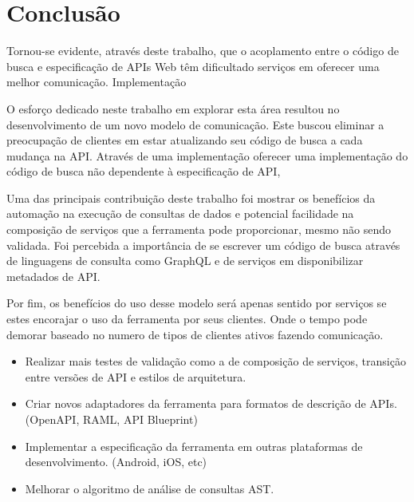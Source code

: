 \chapter{Conclusão}

Tornou-se evidente, através deste trabalho, que o acoplamento entre o código de busca e especificação de APIs Web têm dificultado serviços em oferecer uma melhor comunicação. Implementação %


O esforço dedicado neste trabalho em explorar esta área resultou no desenvolvimento de um novo modelo de comunicação. Este buscou eliminar a preocupação de clientes em estar atualizando seu código de busca a cada mudança na API. Através de uma implementação oferecer uma implementação do código de busca não dependente à especificação de API, 

Uma das principais contribuição deste trabalho foi mostrar os benefícios da automação na execução de consultas de dados e potencial facilidade na composição de serviços que a ferramenta pode proporcionar, mesmo não sendo validada. Foi percebida a importância de se escrever um código de busca através de linguagens de consulta como GraphQL e de serviços em disponibilizar metadados de API.

Por fim, os benefícios do uso desse modelo será apenas sentido por serviços se estes encorajar o uso da ferramenta por seus clientes. Onde o tempo pode demorar baseado no numero de tipos de clientes ativos fazendo comunicação. %



\begin{itemize}
\item Realizar mais testes de validação como a de composição de serviços, transição entre versões de API e estilos de arquitetura.
\item Criar novos adaptadores da ferramenta para formatos de descrição de APIs. (OpenAPI, RAML, API Blueprint)
\item Implementar a especificação da ferramenta em outras plataformas de desenvolvimento. (Android, iOS, etc)
\item Melhorar o algoritmo de análise de consultas AST.
\end{itemize}
